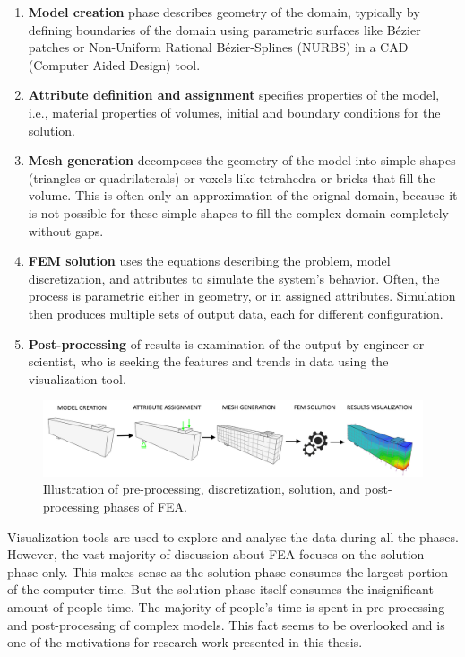 \begin{enumerate}
    \item \textbf{Model creation} phase describes geometry of the domain, typically by defining boundaries of the domain using parametric surfaces like Bézier patches or Non-Uniform Rational B\'ezier-Splines (NURBS) \cite{Marsh2006} in a CAD (Computer Aided Design) tool.
    \item \textbf{Attribute definition and assignment} specifies properties of the model, i.e., material properties of volumes, initial and boundary conditions for the solution.
    \item \textbf{Mesh generation} decomposes the geometry of the model into simple shapes (triangles or quadrilaterals) or voxels like tetrahedra or bricks that fill the volume. This is often only an approximation of the orignal domain, because it is not possible for these simple shapes to fill the complex domain completely without gaps.
    \item \textbf{FEM solution} uses the equations describing the problem, model discretization, and attributes to simulate the system's behavior. Often, the process is parametric either in geometry, or in assigned attributes. Simulation then produces multiple sets of output data, each for different configuration.
    \item \textbf{Post-processing} of results is examination of the output by engineer or scientist, who is seeking the features and trends in data using the visualization tool.
\end{enumerate}

\begin{figure}[H]
    \centering
    \includegraphics[width=\textwidth]{figures/chapter-introduction/FEA-phases}
    \decoRule
    \caption[Illustration of all FEA phases.]{Illustration of pre-processing, discretization, solution, and post-processing phases of FEA.}
    \label{fig:FEA-phases}
\end{figure}

Visualization tools are used to explore and analyse the data during all the phases. However, the vast majority of discussion about FEA focuses on the solution phase only. This makes sense as the solution phase consumes the largest portion of the computer time. But the solution phase itself consumes the insignificant amount of people-time. The majority of people's time is spent in pre-processing and post-processing of complex models. This fact seems to be overlooked and is one of the motivations for research work presented in this thesis.

